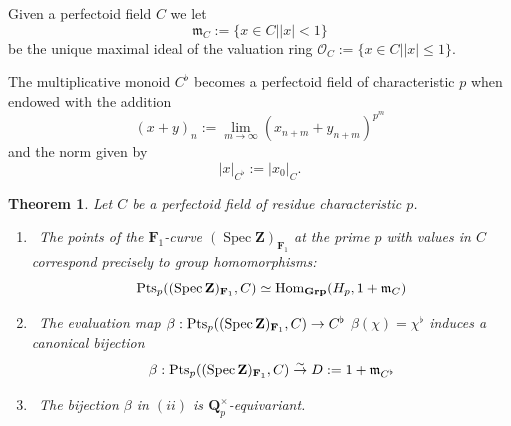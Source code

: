 \documentclass[11pt,a4paper]{article}
\newtheorem{theorem}{Theorem}[section]
\newcommand{\Q}{\mathbf{Q}}
\newcommand{\Z}{\mathbf{Z}}
\newcommand{\Fone}{\mathbf{F}_{1}}
\def\spzf{(\Spec \Z)_{\mathbf{F}_{1}}}
\newcommand{\Pt}{{\rm Pts}}
\newcommand{\Hom}{{\rm{Hom}}}
\newcommand{\Spec}{\operatorname{Spec}}
\newcommand{\Grp}{\rm{\bf{Grp}}}
\begin{document}
 Given a perfectoid field $C$ we let 
\begin{equation}\label{perfideal}
\mathfrak{m}_{C}:=\{x\in C\mid \vert x\vert<1\}
\end{equation}
be the unique maximal ideal of the valuation ring  $\mathcal{O}_C:=\{x\in C\mid \vert x\vert \leq 1\}$.

The multiplicative monoid $C^\flat$ becomes a perfectoid field of characteristic $p$ when endowed with the addition
\begin{equation}\label{perfadd}
(x+y)_n:=\lim _{m \rightarrow \infty}\left(x_{n+m}+y_{n+m}\right)^{p^m}
\end{equation}
and the norm given by 
\begin{equation}\label{perfnorm}
\vert x\vert_{C^\flat}:=\vert x_0\vert_{C}.
\end{equation}


 

\begin{theorem}\label{main}
Let $C$ be a perfectoid field of residue characteristic $p$.
\begin{enumerate}
\item[(i)]~The  points of the $\Fone$-curve $\spzf$ at the prime $p$ with values in $C$ correspond precisely to group homomorphisms:
\[
 \Pt_p(\spzf,C)\simeq\Hom_{\Grp}(H_p,1 + \mathfrak{m}_{C})
\]
\item[(ii)]~The evaluation map $\beta: \Pt_p(\spzf,C)\to C^\flat$ $\beta(\chi)=\chi^\flat$ induces a canonical bijection  $$\beta:\Pt_p(\spzf,C)  \stackrel{\sim}{\to} D := 1 + \mathfrak{m}_{C^\flat}$$ 
\item[(iii)]~The bijection $\beta$ in $(ii)$ is $\Q_p^\times$-equivariant.
\end{enumerate}
\end{theorem}
\end{document}
